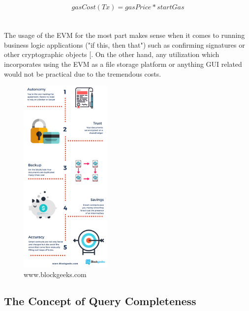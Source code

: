				\[ gasCost(Tx)= {gasPrice * startGas}\]
\\
\\
The usage of the EVM for the most part makes sense when it comes to running business logic applications ("if this, then that") such as confirming signatures or other cryptographic objects [\cite{Ethereum2017}. On the other hand, any utilization which incorporates using the EVM as a file storage platform or anything GUI related would not be practical due to the tremendous costs.



\begin{figure}[h]
\centering
\includegraphics[width=0.4\textwidth]{images/smartcontracts.png}
\caption{\label{fig:Smartcontracts}www.blockgeeks.com}
\end{figure}



\subsection{The Concept of Query Completeness} \label{sssec:querycompleteness}


